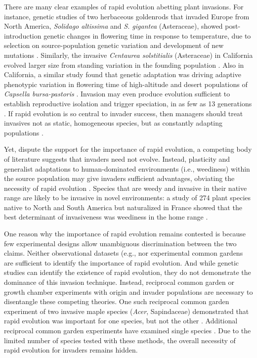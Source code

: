 \documentclass[12pt]{article}\usepackage[]{graphicx}\usepackage[]{color}
\begin{document}
	There are many clear examples of rapid evolution abetting plant invasions. For instance, genetic studies of two herbaceous goldenrods that invaded Europe from North America, \textit{Solidago altissima} and \textit{S. gigantea} (Asteraceae), showed post-introduction genetic changes in flowering time in response to temperature, due to selection on source-population genetic variation and development of new mutations \parencite{Weber1998}. Similarly, the invasive \textit{Centaurea solstitialis} (Asteraceae) in California evolved larger size from standing variation in the founding population \parencite{Barker2017}. Also in California, a similar study found that genetic adaptation was driving adaptive phenotypic variation in flowering time of high-altitude and desert populations of \textit{Capsella bursa-pastoris} \parencite{Linde2001}. Invasion may even produce evolution sufficient to establish reproductive isolation and trigger speciation, in as few as 13 generations \parencite{Hendry2000}. If rapid evolution is so central to invader success, then managers should treat invasives not as static, homogeneous species, but as constantly adapting populations \parencite{Lee2002invasion}. 
	
	Yet, dispute the support for the importance of rapid evolution, a competing body of literature suggests that invaders need not evolve. Instead,  plasticity and generalist adaptations to human-dominated environments (i.e., weediness) within the source population may give invaders sufficient advantages, obviating the necessity of rapid evolution \parencite{Richards2006,Schwartz1994}. Species that are weedy and invasive in their native range are likely to be invasive in novel environments: a study of 274 plant species native to North and South America but naturalized in France showed that the best determinant of invasiveness was weediness in the home range \parencite{Maillet2000}.
	
	One reason why the importance of rapid evolution remains contested is because few experimental designs allow unambiguous discrimination between the two claims. Neither observational datasets (e.g., \parencite{Wolkovich2013} nor experimental common gardens \parencite{Conner2004,Vitasse2009} are sufficient to identify the importance of rapid evolution.   And while genetic studies can identify the existence of rapid evolution, they do not demonstrate the dominance of this invasion technique. Instead, reciprocal common garden or  growth chamber experiments with origin and invader populations are necessary to disentangle these competing theories. One such reciprocal common garden experiment of two invasive maple species (\textit{Acer}, Sapindaceae) demonstrated that rapid evolution was important for one species, but not the other \parencite{Lamarque2015}. Additional reciprocal common garden experiments have examined single species \parencite[e.g.,][]{Williams2008}. Due to the limited number of species tested with these methods, the overall necessity of rapid evolution for invaders remains hidden.
	
\end{document}
